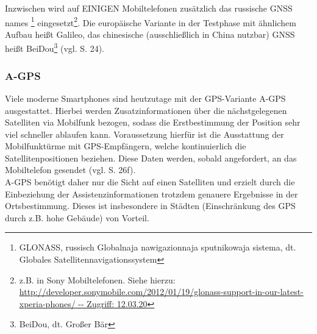 Inzwischen wird auf EINIGEN Mobiltelefonen zusätzlich das russische \gls{GNSS} names \footnote{ GLONASS, russisch Globalnaja nawigazionnaja sputnikowaja sistema, dt. Globales Satellitennavigationssystem} eingesetzt\footnote{ z.B. in Sony Mobiltelefonen. Siehe hierzu: \url{http://developer.sonymobile.com/2012/01/19/glonass-support-in-our-latest-xperia-phones/ -- Zugriff: 12.03.20}}.
Die europäische Variante in der Testphase mit ähnlichem Aufbau heißt Galileo, das chinesische (ausschließlich in China nutzbar) \gls{GNSS} heißt BeiDou\footnote{ BeiDou, dt. Großer Bär} (vgl. \cite{gps} S. 24).
\subsubsection{\gls{A-GPS}}
Viele moderne \glspl{Smartphone} sind heutzutage mit der \gls{GPS}-Variante \gls{A-GPS} ausgestattet. Hierbei werden Zusatzinformationen über die nächstgelegenen Satelliten via Mobilfunk bezogen, sodass die Erstbestimmung der Position sehr viel schneller ablaufen kann.
Voraussetzung hierfür ist die Ausstattung der Mobilfunktürme mit \gls{GPS}-Empfängern, welche kontinuierlich die Satellitenpositionen beziehen. Diese Daten werden, sobald angefordert, an das Mobiltelefon gesendet (vgl. \cite{gps} S. 26f). \\
\gls{A-GPS} benötigt daher nur die Sicht auf einen Satelliten und erzielt durch die Einbeziehung der Assistenzinformationen trotzdem genauere Ergebnisse in der Ortsbestimmung.
Dieses ist insbesondere in Städten (Einschränkung des \gls{GPS} durch z.B. hohe Gebäude) von Vorteil.
